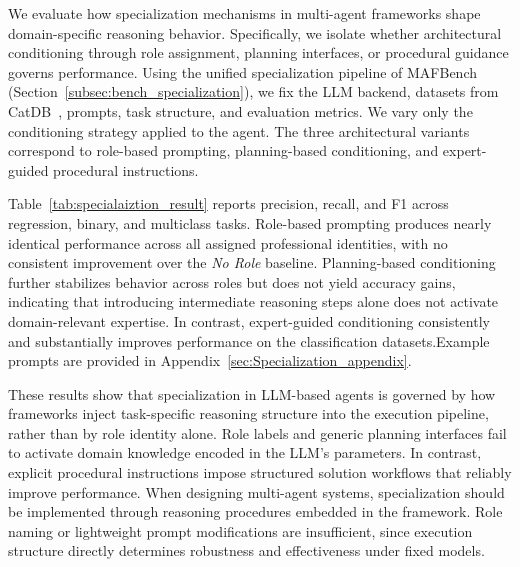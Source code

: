 

We evaluate how specialization mechanisms in multi-agent frameworks shape domain-specific reasoning behavior. Specifically, we isolate whether architectural conditioning through role assignment, planning interfaces, or procedural guidance governs performance. Using the unified specialization pipeline of MAFBench (Section~\ref{subsec:bench_specialization}), we fix the LLM backend, datasets from CatDB~\cite{catdb}, prompts, task structure, and evaluation metrics. We vary only the conditioning strategy applied to the agent. The three architectural variants correspond to role-based prompting, planning-based conditioning, and expert-guided procedural instructions.

Table~\ref{tab:specialaiztion_result} reports precision, recall, and F1 across regression, binary, and multiclass tasks. Role-based prompting produces nearly identical performance across all assigned professional identities, with no consistent improvement over the \emph{No Role} baseline. Planning-based conditioning further stabilizes behavior across roles but does not yield accuracy gains, indicating that introducing intermediate reasoning steps alone does not activate domain-relevant expertise. In contrast, expert-guided conditioning consistently and substantially improves performance on the classification datasets.Example prompts are provided in Appendix~\ref{sec:Specialization_appendix}.

These results show that specialization in LLM-based agents is governed by how frameworks inject task-specific reasoning structure into the execution pipeline, rather than by role identity alone. Role labels and generic planning interfaces fail to activate domain knowledge encoded in the LLM’s parameters. In contrast, explicit procedural instructions impose structured solution workflows that reliably improve performance. When designing multi-agent systems, specialization should be implemented through reasoning procedures embedded in the framework. Role naming or lightweight prompt modifications are insufficient, since execution structure directly determines robustness and effectiveness under fixed models.